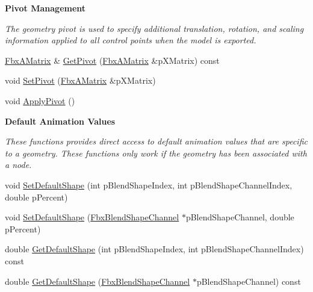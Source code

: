 \begin{Indent}\textbf{ Pivot Management}\par
{\em The geometry pivot is used to specify additional translation, rotation, and scaling information applied to all control points when the model is exported. }\begin{DoxyCompactItemize}
\item 
\hyperlink{class_fbx_a_matrix}{Fbx\+A\+Matrix} \& \hyperlink{class_fbx_geometry_abba9072e0a3f1ad52033996f9809df80}{Get\+Pivot} (\hyperlink{class_fbx_a_matrix}{Fbx\+A\+Matrix} \&p\+X\+Matrix) const
\item 
void \hyperlink{class_fbx_geometry_a0b6b14186134a64ad55a47bcac865d70}{Set\+Pivot} (\hyperlink{class_fbx_a_matrix}{Fbx\+A\+Matrix} \&p\+X\+Matrix)
\item 
void \hyperlink{class_fbx_geometry_a34819c9209a0594344780f117bc641e1}{Apply\+Pivot} ()
\end{DoxyCompactItemize}
\end{Indent}
\begin{Indent}\textbf{ Default Animation Values}\par
{\em These functions provides direct access to default animation values that are specific to a geometry. These functions only work if the geometry has been associated with a node. }\begin{DoxyCompactItemize}
\item 
void \hyperlink{class_fbx_geometry_a6f8337a6336fc2e9bc0ea3d2d04c5ad1}{Set\+Default\+Shape} (int p\+Blend\+Shape\+Index, int p\+Blend\+Shape\+Channel\+Index, double p\+Percent)
\item 
void \hyperlink{class_fbx_geometry_a33ac7c5dc4a3001948b18696f47af802}{Set\+Default\+Shape} (\hyperlink{class_fbx_blend_shape_channel}{Fbx\+Blend\+Shape\+Channel} $\ast$p\+Blend\+Shape\+Channel, double p\+Percent)
\item 
double \hyperlink{class_fbx_geometry_ae3dfb076c1d8729413588b4a934b036b}{Get\+Default\+Shape} (int p\+Blend\+Shape\+Index, int p\+Blend\+Shape\+Channel\+Index) const
\item 
double \hyperlink{class_fbx_geometry_a178e8125306a0e7bb66f71e5472d381f}{Get\+Default\+Shape} (\hyperlink{class_fbx_blend_shape_channel}{Fbx\+Blend\+Shape\+Channel} $\ast$p\+Blend\+Shape\+Channel) const
\end{DoxyCompactItemize}
\end{Indent}
